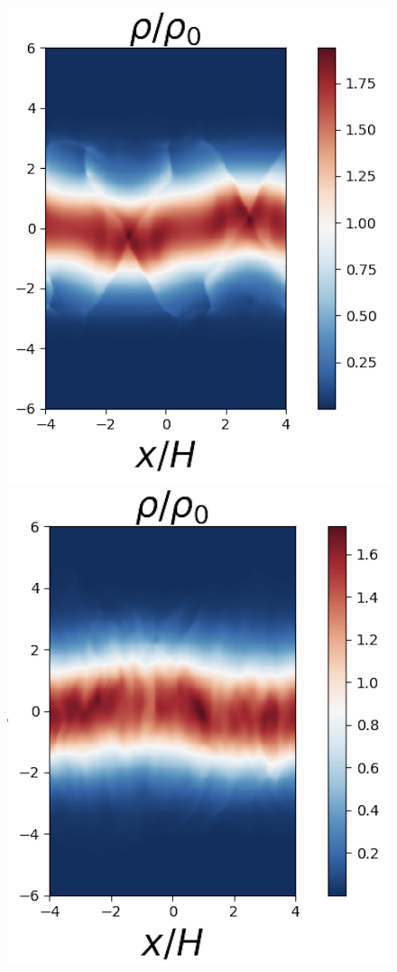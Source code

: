 \documentclass[fleqn,usenatbib]{mnras}
\begin{document}
\begin{figure}
\includegraphics[scale=0.31]{Figures/FlowField5.png}
\includegraphics[scale=0.31]{Figures/FlowField6.png}

\end{figure}
\end{document}
